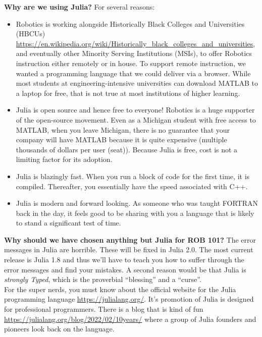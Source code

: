 \textbf{Why are we using Julia?} For several reasons:
\begin{itemize}
    \item Robotics is working alongside Historically Black Colleges and Universities (HBCUs) \url{https://en.wikipedia.org/wiki/Historically_black_colleges_and_universities}, and eventually other Minority Serving Institutions (MSIs), to offer Robotics instruction either remotely or in house. To support remote instruction, we wanted a programming language that we could deliver via a browser. While most students at engineering-intensive universities can download MATLAB to a laptop for free, that is not true at most institutions of higher learning. 
    \item Julia is open source and hence free to everyone! Robotics is a huge supporter of the open-source movement. Even as a Michigan student with free access to MATLAB, when you leave Michigan, there is no guarantee that your company will have MATLAB because it is quite expensive (multiple thousands of dollars per user (seat)). Because Julia is free, cost is not a limiting factor for its adoption. 
    \item Julia is blazingly fast. When you run a block of code for the first time, it is compiled. Thereafter, you essentially have the speed associated with C++.
    \item Julia is modern and forward looking. As someone who was taught FORTRAN back in the day, it feels good to be sharing with you a language that is likely to stand a significant test of time. 
\end{itemize}

\textbf{Why should we have chosen anything but Julia for ROB 101?} The error messages in Julia are horrible. These will be fixed in Julia 2.0. The most current release is Julia 1.8 and thus we'll have to teach you how to suffer through the error messages and find your mistakes. A second reason would be that Julia is \emph{strongly Typed}, which is the proverbial ``blessing'' and a ``curse''. \\


For the super nerds, you must know about the official website for the Julia programming language \url{https://julialang.org/}. It's promotion of Julia is designed for professional programmers. There is a blog that is kind of fun \url{https://julialang.org/blog/2022/02/10years/} where a group of Julia founders and pioneers look back on the language. \\

